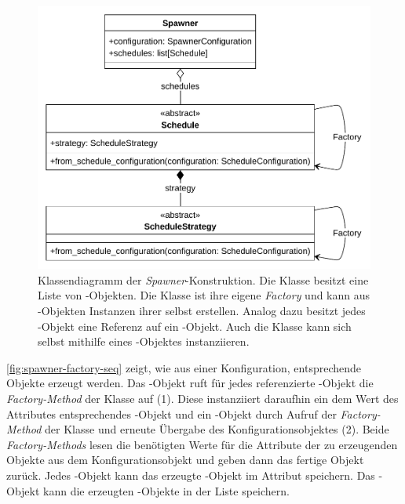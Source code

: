 \begin{figure}[!ht]
	\centering
	\includegraphics[width=0.80\linewidth]{images/diagrams/spawner-factory-class.pdf}
	\caption{Klassendiagramm der \emph{Spawner}-Konstruktion. Die Klasse  besitzt eine Liste von -Objekten. Die Klasse  ist ihre eigene \emph{Factory} und kann aus -Objekten Instanzen ihrer selbst erstellen. Analog dazu besitzt jedes -Objekt eine Referenz auf ein -Objekt. Auch die Klasse  kann sich selbst mithilfe eines -Objektes instanziieren.}
	\label{fig:spawner-factory-class}
\end{figure}

\autoref{fig:spawner-factory-seq} zeigt, wie aus einer Konfiguration, entsprechende Objekte erzeugt werden. Das -Objekt ruft für jedes referenzierte -Objekt die \emph{Factory-Method} der Klasse  auf (1). Diese instanziiert daraufhin ein dem Wert des Attributes  entsprechendes -Objekt und ein -Objekt durch Aufruf der \emph{Factory-Method} der Klasse  und erneute Übergabe des Konfigurationsobjektes (2). Beide \emph{Factory-Methods} lesen die benötigten Werte für die Attribute der zu erzeugenden Objekte aus dem Konfigurationsobjekt und geben dann das fertige Objekt zurück. Jedes -Objekt kann das erzeugte -Objekt im Attribut  speichern. Das -Objekt kann die erzeugten -Objekte in der Liste  speichern.

